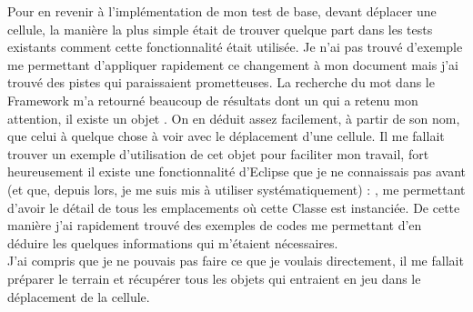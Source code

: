 Pour en revenir \`{a} l'impl\'{e}mentation de mon test de base, devant d\'{e}placer une cellule, la mani\`{e}re la plus simple \'{e}tait de trouver quelque part dans les tests existants comment cette fonctionnalit\'{e} \'{e}tait utilis\'{e}e. Je n'ai pas trouv\'{e} d'exemple me permettant d'appliquer rapidement ce changement \`{a} mon document mais j'ai trouv\'{e} des pistes qui paraissaient prometteuses. La recherche du mot  dans le \gls{Framework} m'a retourn\'{e} beaucoup de r\'{e}sultats dont un qui a retenu mon attention, il existe un objet . On en d\'{e}duit assez facilement, \`{a} partir de son nom, que celui \`{a} quelque chose \`{a} voir avec le d\'{e}placement d'une cellule. Il me fallait trouver un exemple d'utilisation de cet objet pour faciliter mon travail, fort heureusement il existe une fonctionnalit\'{e} d'\gls{Eclipse} que je ne connaissais pas avant (et que, depuis lors, je me suis mis \`{a} utiliser syst\'{e}matiquement) : , me permettant d'avoir le d\'{e}tail de tous les emplacements o\`{u} cette \gls{Classe} est instanci\'{e}e. De cette mani\`{e}re j'ai rapidement trouv\'{e} des exemples de codes me permettant d'en d\'{e}duire les quelques informations qui m'\'{e}taient n\'{e}cessaires.\\

J'ai compris que je ne pouvais pas faire ce que je voulais directement, il me fallait pr\'{e}parer le terrain et r\'{e}cup\'{e}rer tous les objets qui entraient en jeu dans le d\'{e}placement de la cellule.\\

